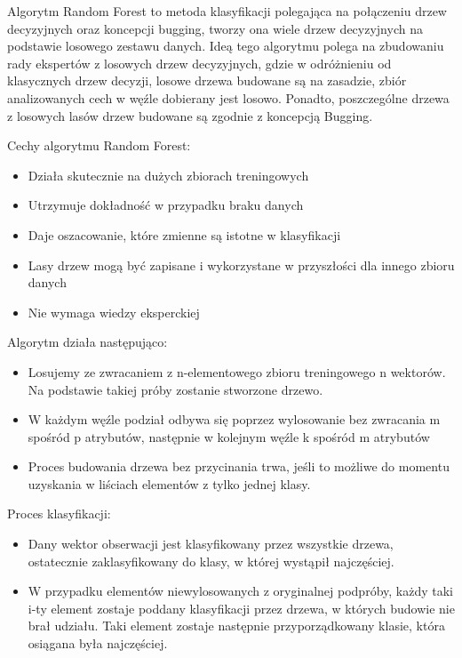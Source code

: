 \documentclass[brudnopis]{xmgr}
\begin{document}
Algorytm Random Forest to metoda klasyfikacji polegająca na połączeniu drzew decyzyjnych oraz koncepcji bugging, tworzy ona wiele drzew decyzyjnych na podstawie losowego zestawu danych. Ideą tego algorytmu polega na zbudowaniu rady ekspertów z losowych drzew decyzyjnych, gdzie w odróżnieniu od klasycznych drzew decyzji, losowe drzewa budowane są na zasadzie, zbiór analizowanych cech w węźle dobierany jest losowo. Ponadto, poszczególne drzewa z losowych lasów drzew budowane są zgodnie z koncepcją Bugging.

\newpage

Cechy algorytmu Random Forest:
\begin{itemize}
\item
Działa skutecznie na dużych zbiorach treningowych
\item
Utrzymuje dokładność w przypadku braku danych
\item
Daje oszacowanie, które zmienne są istotne w klasyfikacji
\item
Lasy drzew mogą być zapisane i wykorzystane w przyszłości dla innego zbioru danych
\item
Nie wymaga wiedzy eksperckiej
\end{itemize}

Algorytm działa następująco:
\begin{itemize}
\item
Losujemy ze zwracaniem z n-elementowego zbioru treningowego n wektorów. Na podstawie takiej próby zostanie stworzone drzewo.
\item
W każdym węźle podział odbywa się poprzez wylosowanie bez zwracania m spośród p atrybutów, następnie w kolejnym węźle k spośród m atrybutów
\item
Proces budowania drzewa bez przycinania trwa, jeśli to możliwe do momentu uzyskania w liściach elementów z tylko jednej klasy.
\end{itemize}

Proces klasyfikacji:
\begin{itemize}
\item
Dany wektor obserwacji jest klasyfikowany przez wszystkie drzewa, ostatecznie zaklasyfikowany do klasy, w której wystąpił najczęściej.
\item
W przypadku elementów niewylosowanych z oryginalnej podpróby, każdy taki i-ty element zostaje poddany klasyfikacji przez drzewa, w których budowie nie brał udziału. Taki element zostaje następnie przyporządkowany klasie, która osiągana była najczęściej.
\end{itemize}
\end{document}
